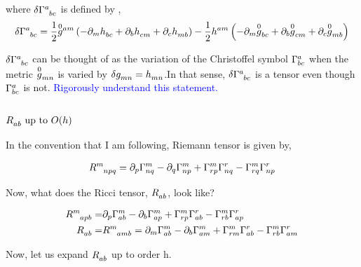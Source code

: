 where $\delta\tt{\Gamma}{a}{bc}$ is defined by ,
\begin{align*}
    \delta\tt{\Gamma}{a}{bc} &=\frac{1}{2} \tt{\overset{0}{g}{}}{am}{}\lera{-\partial_m\tt{h}{}{bc}+ \partial_b\tt{h}{}{cm}+\partial_c\tt{h}{}{mb}}-\frac{1}{2}\tt{h}{am}{} \lera{-\partial_m\tt{\overset{0}{g}}{}{bc}+ \partial_b\tt{\overset{0}{g}}{}{cm}+\partial_c\tt{\overset{0}{g}}{}{mb}}\\
\end{align*}

$\delta\tt{\Gamma}{a}{bc}$ can be thought of as the variation of the Christoffel symbol $\Gamma^{a}_{bc}$ when the metric $\tt{\overset{0}{g}}{}{mn}$ is varied by $\delta\tt{g}{}{mn}= \tt{h}{}{mn}$.In that sense, $\delta\tt{\Gamma}{a}{bc}$ is a tensor even though $\Gamma^{a}_{bc}$ is not. \textcolor{blue}{Rigorously understand this statement.}



\subsubsection{$\tt{R}{}{ab}\text{ up to } O(h)$}


In the convention that I am following, Riemann tensor is given by,

\begin{align*}
 \tt{R}{m}{npq} &= \partial_{p} \cris{m}{nq} - \partial_{q} \cris{m}{np} + \cris{m}{rp} \cris{r}{nq}  - \cris{m}{rq} \cris{r}{np} \\
\end{align*}


Now, what does the Ricci tensor, $\tt{R}{}{ab}$, look like?

\begin{align*}
    \tt{R}{m}{apb} =& \riemann{m}{a}{p}{b}{r}  \\
    \tt{R}{}{ab}=& \tt{R}{m}{amb}=\ricci{a}{b}{m}{r} \\
\end{align*}


Now, let us expand $\tt{R}{}{ab}$ up to order h.

